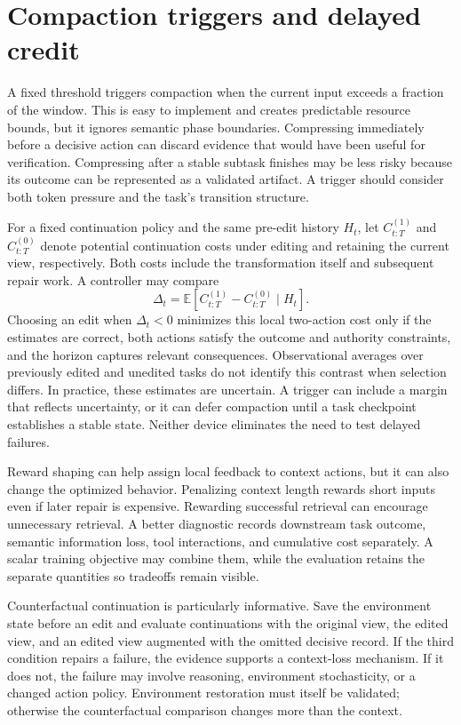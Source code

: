 \section{Compaction triggers and delayed credit}\label{sec:C12:triggers}
A fixed threshold triggers compaction when the current input exceeds a fraction of the window. This is easy to implement and creates predictable resource bounds, but it ignores semantic phase boundaries. Compressing immediately before a decisive action can discard evidence that would have been useful for verification. Compressing after a stable subtask finishes may be less risky because its outcome can be represented as a validated artifact. A trigger should consider both token pressure and the task's transition structure.

For a fixed continuation policy and the same pre-edit history $H_t$, let $C_{t:T}^{(1)}$ and $C_{t:T}^{(0)}$ denote potential continuation costs under editing and retaining the current view, respectively. Both costs include the transformation itself and subsequent repair work. A controller may compare
\begin{equation}
 \Delta_t=\mathbb E\!\left[
 C_{t:T}^{(1)}-C_{t:T}^{(0)}\mid H_t\right].
\end{equation}
Choosing an edit when $\Delta_t<0$ minimizes this local two-action cost only if the estimates are correct, both actions satisfy the outcome and authority constraints, and the horizon captures relevant consequences. Observational averages over previously edited and unedited tasks do not identify this contrast when selection differs. In practice, these estimates are uncertain. A trigger can include a margin that reflects uncertainty, or it can defer compaction until a task checkpoint establishes a stable state. Neither device eliminates the need to test delayed failures.

Reward shaping can help assign local feedback to context actions, but it can also change the optimized behavior. Penalizing context length rewards short inputs even if later repair is expensive. Rewarding successful retrieval can encourage unnecessary retrieval. A better diagnostic records downstream task outcome, semantic information loss, tool interactions, and cumulative cost separately. A scalar training objective may combine them, while the evaluation retains the separate quantities so tradeoffs remain visible.

Counterfactual continuation is particularly informative. Save the environment state before an edit and evaluate continuations with the original view, the edited view, and an edited view augmented with the omitted decisive record. If the third condition repairs a failure, the evidence supports a context-loss mechanism. If it does not, the failure may involve reasoning, environment stochasticity, or a changed action policy. Environment restoration must itself be validated; otherwise the counterfactual comparison changes more than the context.

